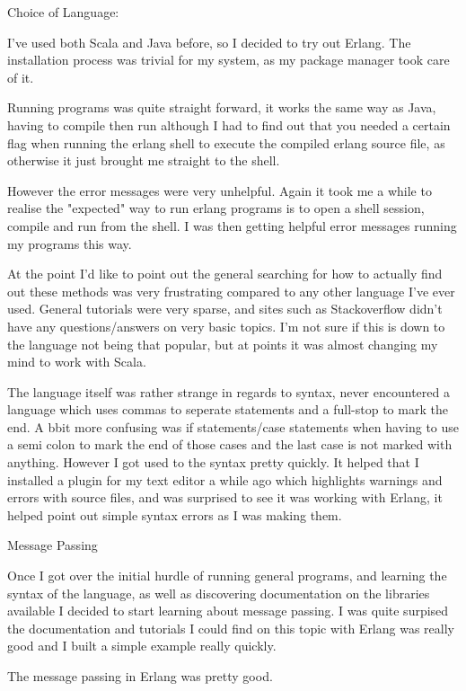 \documentclass[fleqn]{report}
\begin{document}
Choice of Language:

I've used both Scala and Java before, so I decided to try out Erlang. The installation process was
trivial for my system, as my package manager took care of it.

Running programs was quite straight forward, it works the same way as Java, having to compile then run although
I had to find out that you needed a certain flag when running the erlang shell to execute the compiled 
erlang source file, as otherwise it just brought me straight to the shell.

However the error messages were
very unhelpful. Again it took me a while to realise the "expected" way to run erlang programs is
to open a shell session, compile and run from the shell. I was then getting helpful error
messages running my programs this way.

At the point I'd like to point out the general searching for how to actually find out
these methods was very frustrating compared to any other language I've ever used. 
General tutorials were very sparse, and sites such as Stackoverflow didn't have
any questions/answers on very basic topics. I'm not sure if this is down to
the language not being that popular, but at points it was almost changing my
mind to work with Scala. 

The language itself was rather strange in regards to syntax, never encountered a language which uses
commas to seperate statements and a full-stop to mark the end. A bbit more confusing was
if statements/case statements when having to use a semi colon to mark the end of those cases
and the last case is not marked with anything. However I got used to the syntax pretty quickly.
It helped that I installed a plugin for my text editor a while ago which highlights warnings
and errors with source files, and was surprised to see it was working with Erlang, it helped
point out simple syntax errors as I was making them.

Message Passing

Once I got over the initial hurdle of running general programs, and learning the syntax of the language,
as well as discovering documentation on the libraries available I decided to start learning about
message passing. I was quite surpised the documentation and tutorials I could find on this
topic with Erlang was really good and I built a simple example really quickly.

The message passing in Erlang was pretty good.



\end{document}
